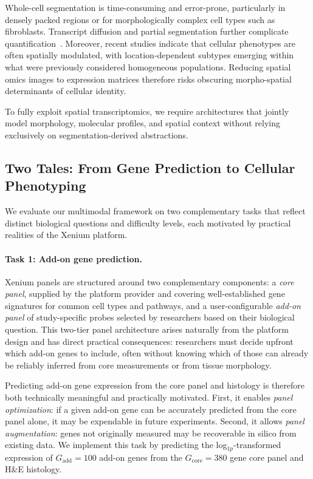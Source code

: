 Whole-cell segmentation is time-consuming and error-prone, particularly in densely packed regions or for morphologically complex cell types such as fibroblasts. Transcript diffusion and partial segmentation further complicate quantification~\cite{bilous_transcriptscellsdissecting_2025}. Moreover, recent studies indicate that cellular phenotypes are often spatially modulated, with location-dependent subtypes emerging within what were previously considered homogeneous populations. Reducing spatial omics images to expression matrices therefore risks obscuring morpho-spatial determinants of cellular identity.

To fully exploit spatial transcriptomics, we require architectures that jointly model morphology, molecular profiles, and spatial context without relying exclusively on segmentation-derived abstractions.

\subsection*{Two Tales: From Gene Prediction to Cellular Phenotyping}
\label{sec:from-gene-prediction-to-phenotyping}

We evaluate our multimodal framework on two complementary tasks that reflect distinct biological questions and difficulty levels, each motivated by practical realities of the Xenium platform.

\paragraph{Task 1: Add-on gene prediction.}
Xenium panels are structured around two complementary components: a \emph{core panel}, supplied by the platform provider and covering well-established gene signatures for common cell types and pathways, and a user-configurable \emph{add-on panel} of study-specific probes selected by researchers based on their biological question. This two-tier panel architecture arises naturally from the platform design and has direct practical consequences: researchers must decide upfront which add-on genes to include, often without knowing which of those can already be reliably inferred from core measurements or from tissue morphology.

Predicting add-on gene expression from the core panel and histology is therefore both technically meaningful and practically motivated. First, it enables \emph{panel optimization}: if a given add-on gene can be accurately predicted from the core panel alone, it may be expendable in future experiments. Second, it allows \emph{panel augmentation}: genes not originally measured may be recoverable in silico from existing data. We implement this task by predicting the log$_{1p}$-transformed expression of $G_{\text{add}} = 100$ add-on genes from the $G_{\text{core}} = 380$ gene core panel and H\&E histology.

